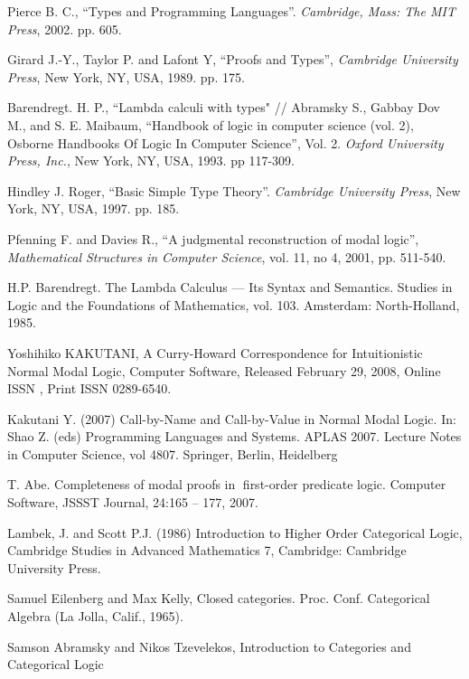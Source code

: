 \documentclass[a4paper]{article}
\begin{document}
\begin{thebibliography}{}
   Pierce B. C., ``Types and Programming Languages''. \textit{Cambridge, Mass: The MIT
  Press}, 2002. pp. 605. \parskip=1mm

   Girard J.-Y., Taylor P. and  Lafont Y, ``Proofs and Types'', \textit{Cambridge University
  Press}, New York, NY, USA, 1989. pp. 175. \parskip=1mm

   Barendregt. H. P., ``Lambda calculi with types" // Abramsky S., Gabbay Dov M., and S. E.
  Maibaum, ``Handbook of logic in computer science (vol. 2), Osborne Handbooks Of Logic In Computer
  Science'', Vol. 2. \textit{Oxford University Press, Inc.}, New York, NY, USA, 1993. pp 117-309.
  \parskip=1mm

   Hindley J. Roger, ``Basic Simple Type Theory''. \textit{Cambridge University Press}, New
  York, NY, USA, 1997. pp. 185. \parskip=1mm

   Pfenning F. and Davies R., ``A judgmental reconstruction of modal logic'',
  \textit{Mathematical Structures in Computer Science}, vol. 11, no 4, 2001, pp. 511-540. \parskip=1mm

   H.P. Barendregt. The Lambda Calculus --- Its Syntax and Semantics. Studies in Logic and
  the Foundations of Mathematics, vol. 103. Amsterdam: North-Holland, 1985.

   Yoshihiko KAKUTANI, A Curry-Howard Correspondence for Intuitionistic Normal Modal Logic, Computer Software, Released February 29, 2008, Online ISSN , Print ISSN 0289-6540.

   Kakutani Y. (2007) Call-by-Name and Call-by-Value in Normal Modal Logic. In: Shao Z. (eds) Programming Languages and Systems. APLAS 2007. Lecture Notes in Computer Science, vol 4807. Springer, Berlin, Heidelberg

   T. Abe. Completeness of modal proofs in first-order predicate logic. Computer Software, JSSST Journal, 24:165 -- 177, 2007.

   Lambek, J. and Scott P.J. (1986) Introduction to Higher Order Categorical Logic, Cambridge Studies in Advanced Mathematics 7, Cambridge: Cambridge University Press.

   Samuel Eilenberg and Max Kelly, Closed categories. Proc. Conf. Categorical Algebra (La Jolla, Calif., 1965).

   Samson Abramsky and Nikos Tzevelekos, Introduction to Categories and Categorical Logic
\end{thebibliography}
\end{document}
